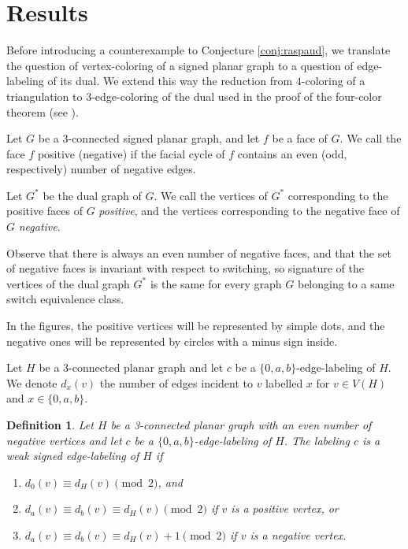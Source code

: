 \documentclass[12pt]{article}
\newtheorem{definition}{Definition}
\begin{document}
\section{Results}

Before introducing a counterexample to Conjecture \ref{conj:raspaud}, we translate the question of vertex-coloring of a signed planar graph to a question of edge-labeling of its dual. We extend this way the reduction from $4$-coloring of a triangulation to $3$-edge-coloring of the dual used in the proof of the four-color theorem (see \cite{robertson1997four}).
\bigskip

Let $G$ be a 3-connected signed planar graph, and let $f$ be a face of $G$. We call the face $f$ positive (negative) if the facial cycle of $f$ contains an even (odd, respectively) number of negative edges.

Let $G^*$ be the dual graph of $G$. We call the vertices of $G^*$ corresponding to the positive faces of $G$ \emph{positive}, and the vertices corresponding to the negative face of $G$ \emph{negative}.

Observe that there is always an even number of negative faces, and that the set of negative faces is invariant with respect to switching, so signature of the vertices of the dual graph $G^*$ is the same for every graph $G$ belonging to a same switch equivalence class.

In the figures, the positive vertices will be represented by simple dots, and the negative ones will be represented by circles with a minus sign inside.

Let $H$ be a 3-connected planar graph and let $c$ be a $\{0,a,b\}$-edge-labeling of $H$. We denote $d_x(v)$ the number of edges incident to $v$ labelled $x$ for $v\in V(H)$ and $x\in\{0,a,b\}$.

\begin{definition}
Let $H$ be a 3-connected planar graph with an even number of negative vertices and let $c$ be a $\{0,a,b\}$-edge-labeling of $H$. The labeling $c$ is a \emph{weak signed edge-labeling} of $H$ if
\begin{enumerate}
    \item[(i)] $d_0(v) \equiv d_H(v) \pmod{2}$, and
    \item[(ii.a)] $d_a(v) \equiv d_b(v) \equiv d_H(v) \pmod{2}$ if $v$ is a positive vertex, or
    \item[(ii.b)] $d_a(v) \equiv d_b(v) \equiv  d_H(v)+1 \pmod{2}$ if $v$ is a negative vertex.
\end{enumerate}
\end{definition}
\end{document}
